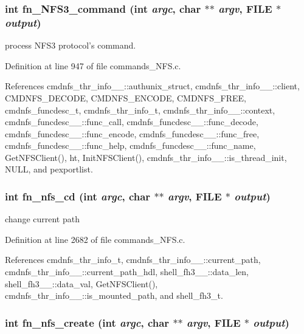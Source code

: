 \subsubsection{\setlength{\rightskip}{0pt plus 5cm}int fn\_\-NFS3\_\-command (int {\em argc}, char $\ast$$\ast$ {\em argv}, FILE $\ast$ {\em output})}\label{commands__NFS_8c_a26}


process NFS3 protocol's command. 

Definition at line 947 of file commands\_\-NFS.c.

References cmdnfs\_\-thr\_\-info\_\-\_\-::authunix\_\-struct, cmdnfs\_\-thr\_\-info\_\-\_\-::client, CMDNFS\_\-DECODE, CMDNFS\_\-ENCODE, CMDNFS\_\-FREE, cmdnfs\_\-funcdesc\_\-t, cmdnfs\_\-thr\_\-info\_\-t, cmdnfs\_\-thr\_\-info\_\-\_\-::context, cmdnfs\_\-funcdesc\_\-\_\-::func\_\-call, cmdnfs\_\-funcdesc\_\-\_\-::func\_\-decode, cmdnfs\_\-funcdesc\_\-\_\-::func\_\-encode, cmdnfs\_\-funcdesc\_\-\_\-::func\_\-free, cmdnfs\_\-funcdesc\_\-\_\-::func\_\-help, cmdnfs\_\-funcdesc\_\-\_\-::func\_\-name, Get\-NFSClient(), ht, Init\-NFSClient(), cmdnfs\_\-thr\_\-info\_\-\_\-::is\_\-thread\_\-init, NULL, and pexportlist.
\subsubsection{\setlength{\rightskip}{0pt plus 5cm}int fn\_\-nfs\_\-cd (int {\em argc}, char $\ast$$\ast$ {\em argv}, FILE $\ast$ {\em output})}\label{commands__NFS_8c_a45}


change current path 

Definition at line 2682 of file commands\_\-NFS.c.

References cmdnfs\_\-thr\_\-info\_\-t, cmdnfs\_\-thr\_\-info\_\-\_\-::current\_\-path, cmdnfs\_\-thr\_\-info\_\-\_\-::current\_\-path\_\-hdl, shell\_\-fh3\_\-\_\-::data\_\-len, shell\_\-fh3\_\-\_\-::data\_\-val, Get\-NFSClient(), cmdnfs\_\-thr\_\-info\_\-\_\-::is\_\-mounted\_\-path, and shell\_\-fh3\_\-t.
\subsubsection{\setlength{\rightskip}{0pt plus 5cm}int fn\_\-nfs\_\-create (int {\em argc}, char $\ast$$\ast$ {\em argv}, FILE $\ast$ {\em output})}\label{commands__NFS_8c_a46}


